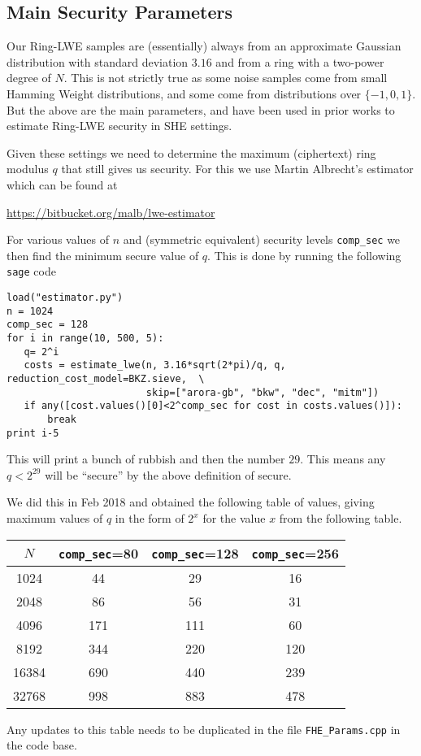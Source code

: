 \subsection{Main Security Parameters}
Our Ring-LWE samples are (essentially) always from an
approximate Gaussian distribution with standard deviation $3.16$
and from a ring with a two-power degree of $N$.
This is not strictly true as some noise samples come
from small Hamming Weight distributions, and some come
from distributions over $\{-1,0,1\}$. 
But the above are the main parameters, and have been used in prior works to
estimate Ring-LWE security in SHE settings.

Given these settings we need to determine the maximum 
(ciphertext) ring modulus $q$ that still gives us security.
For this we use Martin Albrecht's estimator which can
be found at
\begin{center}
\url{https://bitbucket.org/malb/lwe-estimator}
\end{center}
For various values of $n$ and (symmetric equivalent)
security levels \verb+comp_sec+ we then find the minimum secure
value of $q$.
This is done by running the following \verb+sage+ code
\begin{verbatim}
load("estimator.py")
n = 1024
comp_sec = 128
for i in range(10, 500, 5):
   q= 2^i
   costs = estimate_lwe(n, 3.16*sqrt(2*pi)/q, q, reduction_cost_model=BKZ.sieve,  \
                        skip=["arora-gb", "bkw", "dec", "mitm"])
   if any([cost.values()[0]<2^comp_sec for cost in costs.values()]):
       break
print i-5
\end{verbatim}
This will print a bunch of rubbish and then the number $29$. 
This means any $q < 2^{29}$ will be ``secure'' by the above definition of secure.

We did this in Feb 2018 and obtained the following table of values, giving maximum
values of $q$ in the form of $2^x$ for the value $x$ from the following table.
\begin{center}
\begin{tabular}{|c|c|c|c|}
\hline
$N$   & \verb+comp_sec+=80 & \verb+comp_sec+=128 & \verb+comp_sec+=256 \\
\hline
1024  &  44 &    29        & 16 \\
2048  &  86 &    56        & 31 \\
4096  & 171 &   111        & 60 \\
8192  & 344 &   220        & 120 \\
16384 & 690 &   440        & 239 \\
32768 & 998 &   883        & 478 \\
\hline
\end{tabular}
\end{center}
Any updates to this table needs to be duplicated in 
the file \verb+FHE_Params.cpp+ in the code base.

